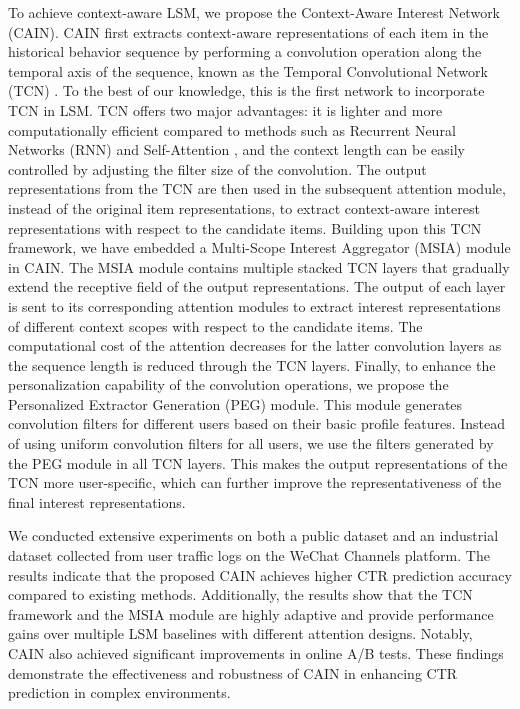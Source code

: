 To achieve context-aware LSM, we propose the Context-Aware Interest Network (CAIN). CAIN first extracts context-aware representations of each item in the historical behavior sequence by performing a convolution operation along the temporal axis of the sequence, known as the Temporal Convolutional Network (TCN) \cite{bai2018empirical}. To the best of our knowledge, this is the first network to incorporate TCN in LSM. TCN offers two major advantages: it is lighter and more computationally efficient compared to methods such as Recurrent Neural Networks (RNN) \cite{hochreiter1997long,chung2014empirical} and Self-Attention \cite{vaswani2017attention}, and the context length can be easily controlled by adjusting the filter size of the convolution. The output representations from the TCN are then used in the subsequent attention module, instead of the original item representations, to extract context-aware interest representations with respect to the candidate items. Building upon this TCN framework, we have embedded a Multi-Scope Interest Aggregator (MSIA) module in CAIN. The MSIA module contains multiple stacked TCN layers that gradually extend the receptive field of the output representations. The output of each layer is sent to its corresponding attention modules to extract interest representations of different context scopes with respect to the candidate items. The computational cost of the attention decreases for the latter convolution layers as the sequence length is reduced through the TCN layers. Finally, to enhance the personalization capability of the convolution operations, we propose the Personalized Extractor Generation (PEG) module. This module generates convolution filters for different users based on their basic profile features. Instead of using uniform convolution filters for all users, we use the filters generated by the PEG module in all TCN layers. This makes the output representations of the TCN more user-specific, which can further improve the representativeness of the final interest representations.

We conducted extensive experiments on both a public dataset and an industrial dataset collected from user traffic logs on the WeChat Channels platform. The results indicate that the proposed CAIN achieves higher CTR prediction accuracy compared to existing methods. Additionally, the results show that the TCN framework and the MSIA module are highly adaptive and provide performance gains over multiple LSM baselines with different attention designs. Notably, CAIN also achieved significant improvements in online A/B tests. These findings demonstrate the effectiveness and robustness of CAIN in enhancing CTR prediction in complex environments.
